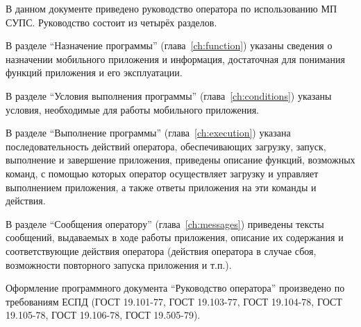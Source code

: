 \Annotation

В данном документе приведено руководство оператора по использованию МП СУПС.
Руководство состоит из четырёх разделов.

В разделе ``Назначение программы'' (глава~\ref{ch:function}) указаны сведения о назначении мобильного приложения и информация, достаточная для понимания функций приложения и его эксплуатации.

В разделе ``Условия выполнения программы'' (глава~\ref{ch:conditions}) указаны условия, необходимые для работы мобильного приложения.

В разделе ``Выполнение программы'' (глава~\ref{ch:execution}) указана последовательность действий оператора, обеспечивающих загрузку, запуск, выполнение и завершение приложения, приведены описание функций, возможных команд, с помощью которых оператор осуществляет загрузку и управляет выполнением приложения, а также ответы приложения на эти команды и действия.

В разделе ``Сообщения оператору'' (глава~\ref{ch:messages}) приведены тексты сообщений, выдаваемых в ходе работы приложения, описание их содержания и соответствующие действия оператора (действия оператора в случае сбоя, возможности повторного запуска приложения и т.п.).

Оформление программного документа ``Руководство оператора'' произведено по требованиям ЕСПД (ГОСТ 19.101-77, ГОСТ 19.103-77, ГОСТ 19.104-78, ГОСТ 19.105-78, ГОСТ 19.106-78, ГОСТ 19.505-79).
